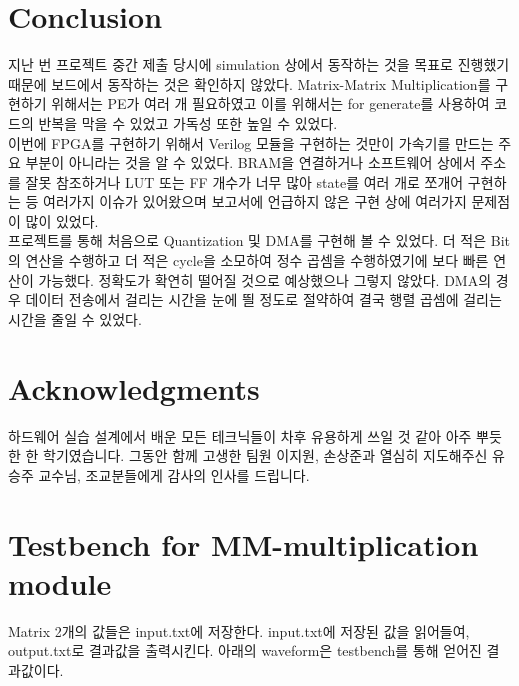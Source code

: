 \documentclass{article}
\begin{document}
\section{Conclusion}
지난 번 프로젝트 중간 제출 당시에 simulation 상에서 동작하는 것을 목표로 진행했기 때문에 보드에서 동작하는 것은 확인하지 않았다. Matrix-Matrix Multiplication를 구현하기 위해서는 PE가 여러 개 필요하였고 이를 위해서는 for generate를 사용하여 코드의 반복을 막을 수 있었고 가독성 또한 높일 수 있었다. \\

이번에 FPGA를 구현하기 위해서 Verilog 모듈을 구현하는 것만이 가속기를 만드는 주요 부분이 아니라는 것을 알 수 있었다. BRAM을 연결하거나 소프트웨어 상에서 주소를 잘못 참조하거나 LUT 또는 FF 개수가 너무 많아 state를 여러 개로 쪼개어 구현하는 등 여러가지 이슈가 있어왔으며 보고서에 언급하지 않은 구현 상에 여러가지 문제점이 많이 있었다. \\

프로젝트를 통해 처음으로 Quantization 및 DMA를 구현해 볼 수 있었다. 더 적은 Bit의 연산을 수행하고 더 적은 cycle을 소모하여 정수 곱셈을 수행하였기에 보다 빠른 연산이 가능했다. 정확도가 확연히 떨어질 것으로 예상했으나 그렇지 않았다. DMA의 경우 데이터 전송에서 걸리는 시간을 눈에 띌 정도로 절약하여 결국 행렬 곱셈에 걸리는 시간을 줄일 수 있었다. \\

\section*{Acknowledgments}
하드웨어 실습 설계에서 배운 모든 테크닉들이 차후 유용하게 쓰일 것 같아 아주 뿌듯한 한 학기였습니다. 그동안 함께 고생한 팀원 이지원, 손상준과 열심히 지도해주신 유승주 교수님, 조교분들에게 감사의 인사를 드립니다. \\




\newpage
\appendix
\section{Testbench for MM-multiplication module}
Matrix 2개의 값들은 input.txt에 저장한다. input.txt에 저장된 값을 읽어들여, output.txt로 결과값을 출력시킨다. 아래의 waveform은 testbench를 통해 얻어진 결과값이다.
\end{document}
